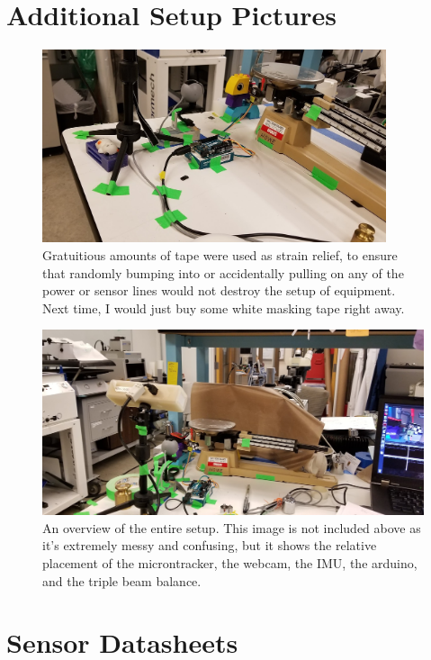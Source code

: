 \documentclass[preprint,12pt,3p]{elsarticle}
\begin{document}
\newpage

\section{Additional Setup Pictures}
\label{appendix-setup}


\begin{figure}[H]
\centering
\includegraphics[width=0.9\textwidth]{images/setup/setup_closeup_tape.jpg}
\caption{Gratuitious amounts of tape were used as strain relief, to ensure that randomly bumping into or accidentally pulling on any of the power or sensor lines would not destroy the setup of equipment. Next time, I would just buy some white masking tape right away.
}
\end{figure}


\begin{figure}[H]
\centering
\includegraphics[width=1\textwidth]{images/setup/setup_overview.jpg}
\caption{An overview of the entire setup. This image is not included above as it's extremely messy and confusing, but it shows the relative placement of the microntracker, the webcam, the IMU, the arduino, and the triple beam balance.
}
\end{figure}

\section{Sensor Datasheets}
\label{appendix-sensors}
\end{document}
